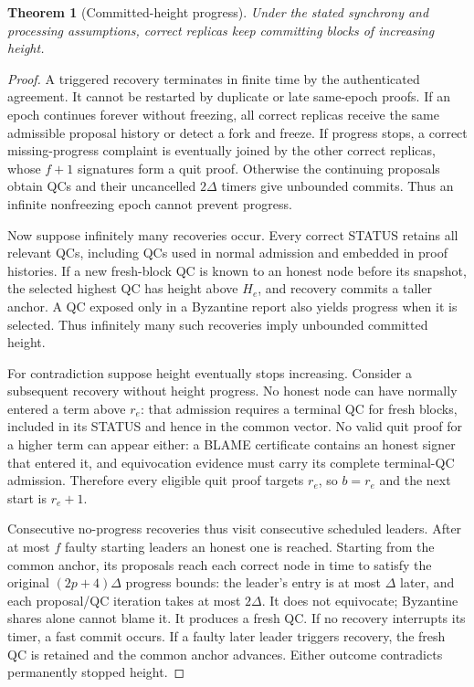 \documentclass[10pt,a4paper]{article}
\newtheorem{theorem}{Theorem}
\begin{document}
\begin{theorem}[Committed-height progress]
Under the stated synchrony and processing assumptions, correct replicas
keep committing blocks of increasing height.
\end{theorem}
\begin{proof}
A triggered recovery terminates in finite time by the authenticated
agreement. It cannot be restarted by duplicate or late same-epoch proofs.
If an epoch continues forever without freezing, all correct replicas
receive the same admissible proposal history or detect a fork and freeze.
If progress stops, a correct missing-progress complaint is eventually
joined by the other correct replicas, whose $f+1$ signatures form a quit
proof. Otherwise the continuing proposals obtain QCs and their uncancelled
$2\Delta$ timers give unbounded commits. Thus an infinite nonfreezing epoch
cannot prevent progress.

Now suppose infinitely many recoveries occur. Every correct STATUS retains
all relevant QCs, including QCs used in normal admission and embedded in
proof histories. If a new fresh-block QC is known to an honest node before
its snapshot, the selected highest QC has height above $H_e$, and recovery
commits a taller anchor. A QC exposed only in a Byzantine report also yields
progress when it is selected. Thus infinitely many such recoveries imply
unbounded committed height.

For contradiction suppose height eventually stops increasing. Consider a
subsequent recovery without height progress. No honest node can have
normally entered a term above $r_e$: that admission requires a terminal QC
for fresh blocks, included in its STATUS and hence in the common vector.
No valid quit proof for a higher term can appear either: a BLAME certificate
contains an honest signer that entered it, and equivocation evidence must
carry its complete terminal-QC admission. Therefore every eligible quit
proof targets $r_e$, so $b=r_e$ and the next start is $r_e+1$.

Consecutive no-progress recoveries thus visit consecutive scheduled leaders.
After at most $f$ faulty starting leaders an honest one is reached. Starting
from the common anchor, its proposals reach each correct node in time to
satisfy the original $(2p+4)\Delta$ progress bounds: the leader's entry is
at most $\Delta$ later, and each proposal/QC iteration takes at most
$2\Delta$. It does not equivocate; Byzantine shares alone cannot blame it.
It produces a fresh QC. If no recovery interrupts its timer, a fast commit
occurs. If a faulty later leader triggers recovery, the fresh QC is retained
and the common anchor advances. Either outcome contradicts permanently
stopped height.
\end{proof}
\end{document}
